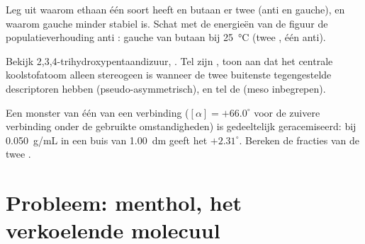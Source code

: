 \begin{exercise}[$\star\star\star$]\label{exo:b1:stereochemistry-in-depth:10}
Leg uit waarom ethaan één soort  heeft en butaan
er twee (anti en gauche), en waarom gauche minder stabiel is. Schat met
de energieën van de figuur de populatieverhouding anti : gauche van
butaan bij \qty{25}{\celsius} (twee , één anti).
\end{exercise}

\begin{exercise}[$\star\star\star$]\label{exo:b1:stereochemistry-in-depth:11}
Bekijk 2,3,4-trihydroxypentaandizuur,
. Tel zijn , toon aan
dat het centrale koolstofatoom alleen stereogeen is wanneer de twee
buitenste tegengestelde descriptoren hebben (pseudo-asymmetrisch), en
tel de  (meso inbegrepen).
\end{exercise}

\begin{exercise}[$\star\star\star$]\label{exo:b1:stereochemistry-in-depth:12}
Een monster van één  van een verbinding ($[\alpha] = +66.0^\circ$
voor de zuivere verbinding onder de gebruikte omstandigheden) is
gedeeltelijk geracemiseerd: bij \qty{0.050}{g/mL} in een buis van
\qty{1.00}{dm} geeft het $+2.31^\circ$. Bereken de fracties van de twee
.
\end{exercise}

\section{Probleem: menthol, het verkoelende molecuul}

